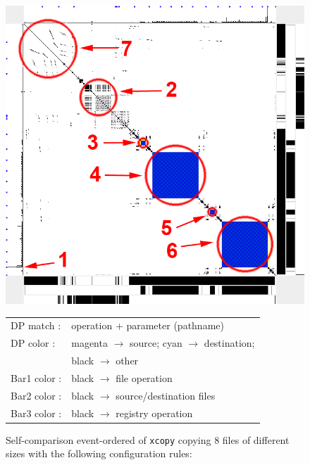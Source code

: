 \begin{figure}[tb]
\begin{center}
\includegraphics[width=1.0\columnwidth]{lviz/cp-xcopy.png}
\caption{Self-comparison event-ordered \VDP{} of {\tt xcopy}
copying 8 files of different sizes with the following configuration rules: 
}
\begin{tabular}{ll}
DP match : & operation + parameter (pathname)\\
DP color : & magenta $\rightarrow$ source; cyan $\rightarrow$ destination;\\
 & black $\rightarrow$ other\\
Bar1 color : & black $\rightarrow$ file operation\\
Bar2 color : & black $\rightarrow$ source/destination files\\
Bar3 color : & black $\rightarrow$ registry operation
\end{tabular}
\label{fig:cp-xcopy}
\end{center}
\end{figure}




